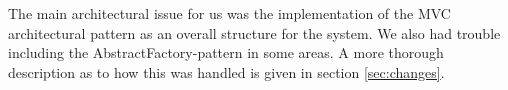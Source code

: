 \label{sec:issues}The main architectural issue for us was the implementation of the MVC architectural pattern as an overall structure for the system. We also had trouble including the AbstractFactory-pattern in some areas. A more thorough description as to how this was handled is given in section \ref{sec:changes}.

